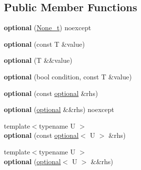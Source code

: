\subsection*{Public Member Functions}
\begin{DoxyCompactItemize}
\item 
\hypertarget{classmcurses_1_1optional_ac8c51c997516ebd013030ee5ac475c2e}{}\label{classmcurses_1_1optional_ac8c51c997516ebd013030ee5ac475c2e} 
{\bfseries optional} (\hyperlink{classmcurses_1_1None__t}{None\+\_\+t}) noexcept
\item 
\hypertarget{classmcurses_1_1optional_a12bd45441ff0fd8a59815a62f7927710}{}\label{classmcurses_1_1optional_a12bd45441ff0fd8a59815a62f7927710} 
{\bfseries optional} (const T \&value)
\item 
\hypertarget{classmcurses_1_1optional_ae3f463b7772ef06e04367a03f986995d}{}\label{classmcurses_1_1optional_ae3f463b7772ef06e04367a03f986995d} 
{\bfseries optional} (T \&\&value)
\item 
\hypertarget{classmcurses_1_1optional_a19facb345a5ae4eec360fa8b78c82e1c}{}\label{classmcurses_1_1optional_a19facb345a5ae4eec360fa8b78c82e1c} 
{\bfseries optional} (bool condition, const T \&value)
\item 
\hypertarget{classmcurses_1_1optional_a35497288a1efd5506f6be62862a38afe}{}\label{classmcurses_1_1optional_a35497288a1efd5506f6be62862a38afe} 
{\bfseries optional} (const \hyperlink{classmcurses_1_1optional}{optional} \&rhs)
\item 
\hypertarget{classmcurses_1_1optional_aa7a974f08420860733f18590607c11f4}{}\label{classmcurses_1_1optional_aa7a974f08420860733f18590607c11f4} 
{\bfseries optional} (\hyperlink{classmcurses_1_1optional}{optional} \&\&rhs) noexcept
\item 
\hypertarget{classmcurses_1_1optional_a94ec88a7bf0640b7b2cf90506b14d569}{}\label{classmcurses_1_1optional_a94ec88a7bf0640b7b2cf90506b14d569} 
{\footnotesize template$<$typename U $>$ }\\{\bfseries optional} (const \hyperlink{classmcurses_1_1optional}{optional}$<$ U $>$ \&rhs)
\item 
\hypertarget{classmcurses_1_1optional_a63a5387aa6c1cb3e6f1c21c928a12133}{}\label{classmcurses_1_1optional_a63a5387aa6c1cb3e6f1c21c928a12133} 
{\footnotesize template$<$typename U $>$ }\\{\bfseries optional} (\hyperlink{classmcurses_1_1optional}{optional}$<$ U $>$ \&\&rhs)
\item 
\hypertarget{classmcurses_1_1optional_ae0a018ac2337c34d41288268c2fa5fe0}{}\label{classmcurses_1_1optional_ae0a018ac2337c34d41288268c2fa5fe0} 

\end{DoxyCompactItemize}
